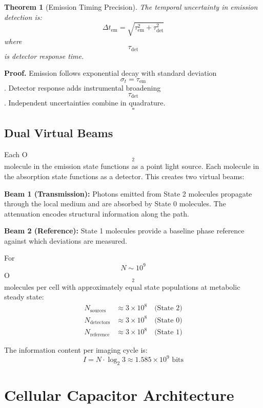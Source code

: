 \documentclass[twocolumn,10pt]{article}
\newtheorem{theorem}{Theorem}[section]
\begin{document}
\begin{theorem}[Emission Timing Precision]
The temporal uncertainty in emission detection is:
\begin{equation}
\Delta t_{\text{em}} = \sqrt{\tau_{\text{em}}^2 + \tau_{\text{det}}^2}
\end{equation}
where $$\tau_{\text{det}}$$ is detector response time.
\end{theorem}

\textbf{Proof.} Emission follows exponential decay with standard deviation $$\sigma_t = \tau_{\text{em}}$$. Detector response adds instrumental broadening $$\tau_{\text{det}}$$. Independent uncertainties combine in quadrature. \hfill $$\square$$

\subsection{Dual Virtual Beams}

Each O$$_2$$ molecule in the emission state functions as a point light source. Each molecule in the absorption state functions as a detector. This creates two virtual beams:

\textbf{Beam 1 (Transmission):} Photons emitted from State 2 molecules propagate through the local medium and are absorbed by State 0 molecules. The attenuation encodes structural information along the path.

\textbf{Beam 2 (Reference):} State 1 molecules provide a baseline phase reference against which deviations are measured.

For $$N \sim 10^9$$ O$$_2$$ molecules per cell with approximately equal state populations at metabolic steady state:
\begin{align}
N_{\text{sources}} &\approx 3 \times 10^8 \quad \text{(State 2)} \\
N_{\text{detectors}} &\approx 3 \times 10^8 \quad \text{(State 0)} \\
N_{\text{reference}} &\approx 3 \times 10^8 \quad \text{(State 1)}
\end{align}

The information content per imaging cycle is:
\begin{equation}
I = N \cdot \log_2 3 \approx 1.585 \times 10^9 \text{ bits}
\end{equation}

\section{Cellular Capacitor Architecture}
\end{document}
